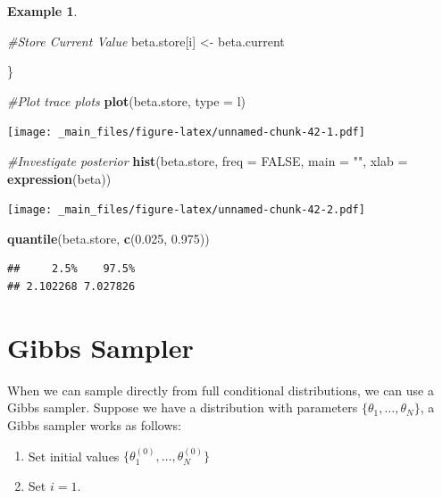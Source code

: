 \documentclass[
]{book}
\newenvironment{Shaded}{\begin{snugshade}}{\end{snugshade}}
\newcommand{\AttributeTok}[1]{\textcolor[rgb]{0.13,0.29,0.53}{#1}}
\newcommand{\CommentTok}[1]{\textcolor[rgb]{0.56,0.35,0.01}{\textit{#1}}}
\newcommand{\ConstantTok}[1]{\textcolor[rgb]{0.56,0.35,0.01}{#1}}
\newcommand{\FloatTok}[1]{\textcolor[rgb]{0.00,0.00,0.81}{#1}}
\newcommand{\FunctionTok}[1]{\textcolor[rgb]{0.13,0.29,0.53}{\textbf{#1}}}
\newcommand{\NormalTok}[1]{#1}
\newcommand{\OtherTok}[1]{\textcolor[rgb]{0.56,0.35,0.01}{#1}}
\newcommand{\StringTok}[1]{\textcolor[rgb]{0.31,0.60,0.02}{#1}}
\theoremstyle{definition}
\theoremstyle{definition}
\newtheorem{example}{Example}[chapter]
\theoremstyle{definition}
\theoremstyle{definition}
\theoremstyle{remark}
\begin{document}
\begin{example}
\begin{Shaded}
\begin{Highlighting}[]
  \CommentTok{\#Store Current Value}
\NormalTok{  beta.store[i] }\OtherTok{\textless{}{-}}\NormalTok{ beta.current}


\NormalTok{\}}

\CommentTok{\#Plot trace plots}
\FunctionTok{plot}\NormalTok{(beta.store, }\AttributeTok{type =} \StringTok{\textquotesingle{}l\textquotesingle{}}\NormalTok{)}
\end{Highlighting}
\end{Shaded}

\texttt{[image: \_main\_files/figure-latex/unnamed-chunk-42-1.pdf]}

\begin{Shaded}
\begin{Highlighting}[]
\CommentTok{\#Investigate posterior}
\FunctionTok{hist}\NormalTok{(beta.store, }\AttributeTok{freq =} \ConstantTok{FALSE}\NormalTok{, }\AttributeTok{main =} \StringTok{""}\NormalTok{, }\AttributeTok{xlab =} \FunctionTok{expression}\NormalTok{(beta))}
\end{Highlighting}
\end{Shaded}

\texttt{[image: \_main\_files/figure-latex/unnamed-chunk-42-2.pdf]}

\begin{Shaded}
\begin{Highlighting}[]
\FunctionTok{quantile}\NormalTok{(beta.store, }\FunctionTok{c}\NormalTok{(}\FloatTok{0.025}\NormalTok{, }\FloatTok{0.975}\NormalTok{))}
\end{Highlighting}
\end{Shaded}

\begin{verbatim}
##     2.5%    97.5% 
## 2.102268 7.027826
\end{verbatim}

\hypertarget{gibbs-sampler}{%
\section{Gibbs Sampler}\label{gibbs-sampler}}

When we can sample directly from full conditional distributions, we can use a Gibbs sampler. Suppose we have a distribution with parameters \(\{\theta_1, \ldots, \theta_N\}\), a Gibbs sampler works as follows:

\begin{enumerate}
\def\labelenumi{\arabic{enumi}.}
\item
  Set initial values \(\{\theta_1^{(0)}, \ldots, \theta_N^{(0)}\}\)
\item
  Set \(i = 1\).


\end{enumerate}
\end{example}
\end{document}
